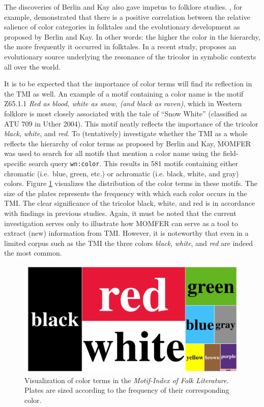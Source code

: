 The discoveries of Berlin and Kay also gave impetus to folklore studies. \citeauthor{bolton:1979}, for example, demonstrated that there is a positive correlation between the relative salience of color categories in folktales and the evolutionary development as proposed by Berlin and Kay\autocite{bolton:1979}. In other words: the higher the color in the hierarchy, the more frequently it occurred in folktales. In a recent study, \citeauthor{hemming:2012} proposes an evolutionary source underlying the resonance of the tricolor in symbolic contexts all over the world.\autocite{hemming:2012}

It is to be expected that the importance of color terms will find its reflection in the TMI as well. An example of a motif containing a color name is the motif Z65.1.1 \emph{Red as blood, white as snow, (and black as raven)}, which in Western folklore is most closely associated with the tale of ``Snow White'' (classified as ATU 709 in Uther 2004). This motif neatly reflects the importance of the tricolor \emph{black}, \emph{white}, and \emph{red}. To (tentatively) investigate whether the TMI as a whole reflects the hierarchy of color terms as proposed by Berlin and Kay, MOMFER was used to search for all motifs that mention a color name using the field-specific search query \texttt{wn:color}. This results in 581 motifs containing either chromatic (i.e.\ blue, green, etc.) or achromatic (i.e. black, white, and gray) colors. Figure \ref{fig:color-terms} visualizes the distribution of the color terms in these motifs. The size of the plates represents the frequency with which each color occurs in the TMI. The clear significance of the tricolor black, white, and red is in accordance with findings in previous studies. Again, it must be noted that the current investigation serves only to illustrate how MOMFER can serve as a tool to extract (new) information from TMI. However, it is noteworthy that even in a limited corpus such as the TMI the three colors \emph{black}, \emph{white}, and \emph{red} are indeed the most common.

\begin{figure}
    \centering
    \includegraphics[width=\textwidth]{images/color-terms.pdf}
    \caption{Visualization of color terms in the \emph{Motif-Index of Folk Literature}. Plates are sized according to the frequency of their corresponding color.}
    \label{fig:color-terms}
\end{figure}

